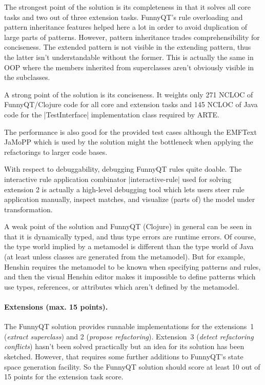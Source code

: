 \documentclass[submission]{eptcs}
\newcommand{\code}{\clojureinline}
\begin{document}
The strongest point of the solution is its completeness in that it solves all
core tasks and two out of three extension tasks.  FunnyQT's rule overloading
and pattern inheritance features helped here a lot in order to avoid
duplication of large parts of patterns.  However, pattern inheritance trades
comprehensibility for conciseness.  The extended pattern is not visible in the
extending pattern, thus the latter isn't understandable without the former.
This is actually the same in OOP where the members inherited from superclasses
aren't obviously visible in the subclasses.

A strong point of the solution is its conciseness.  It weights only 271 NCLOC
of FunnyQT/Clojure code for all core and extension tasks and 145 NCLOC of Java
code for the \code|TestInterface| implementation class required by ARTE.

The performance is also good for the provided test cases although the EMFText
JaMoPP which is used by the solution might the bottleneck when applying the
refactorings to larger code bases.

With respect to debuggability, debugging FunnyQT rules quite doable.  The
interactive rule application combinator \code|interactive-rule| used for
solving extension 2 is actually a high-level debugging tool which lets users
steer rule application manually, inspect matches, and visualize (parts of) the
model under transformation.

A weak point of the solution and FunnyQT (Clojure) in general can be seen in
that it is dynamically typed, and thus type errors are runtime errors.  Of
course, the type world implied by a metamodel is different than the type world
of Java (at least unless classes are generated from the metamodel).  But for
example, Henshin requires the metamodel to be known when specifying patterns
and rules, and then the visual Henshin editor makes it impossible to define
patterns which use types, references, or attributes which aren't defined by the
metamodel.


\paragraph{Extensions (max. 15 points).}

The FunnyQT solution provides runnable implementations for the extensions~1
(\emph{extract superclass}) and 2 (\emph{propose refactoring}).  Extension~3
(\emph{detect refactoring conflicts}) hasn't been solved practically but an
idea for its solution has been sketched.  However, that requires some further
additions to FunnyQT's state space generation facility.  So the FunnyQT
solution should score at least 10 out of 15 points for the extension task
score.
\end{document}
